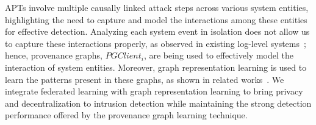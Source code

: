  APTs involve multiple causally linked attack steps across various system entities, highlighting the need to capture and model the interactions among these entities for effective detection. Analyzing each system event in isolation does not allow us to capture these interactions properly, as observed in existing log-level systems~\cite{deeplog2017,liu2019log2vec,xia2019loggan}; hence, provenance graphs, \( PGClient_{i} \), are being used to effectively model the interaction of system entities. Moreover, graph representation learning is used to learn the patterns present in these graphs, as shown in related works~\cite{flash2024,cheng2023kairos,jia2023magic}. We integrate federated learning with graph representation learning to bring privacy and decentralization to intrusion detection while maintaining the strong detection performance offered by the provenance graph learning technique.





